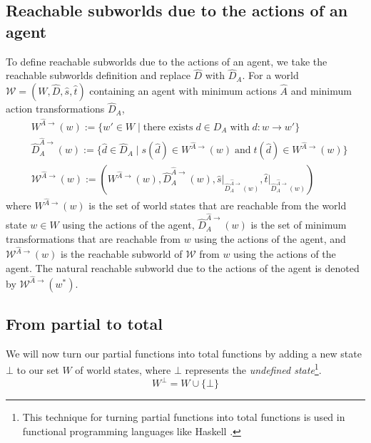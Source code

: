 \subsection{Reachable subworlds due to the actions of an agent}


To define reachable subworlds due to the actions of an agent, we take the reachable subworlds definition and replace $\hat{D}$ with $\hat{D}_{A}$.
For a world $\mathscr{W} = (W, \hat{D}, \hat{s}, \hat{t})$ containing an agent with minimum actions $\hat{A}$ and minimum action transformations $\hat{D}_{A}$,
\begin{align}
	 & W^{\hat{A}\to}(w) := \{ w' \in W \mid \text{there exists} \; d \in D_{A} \; \text{with} \; d: w \to w' \}                                                                 \\
	 & \hat{D}_{A}^{\hat{A}\to}(w) := \{ \hat{d} \in \hat{D}_{A} \mid s(\hat{d}) \in W^{\hat{A}\to}(w) \; \text{and} \; t(\hat{d}) \in W^{\hat{A}\to}(w) \}                      \\
	 & \mathscr{W}^{\hat{A}\to}(w) := (W^{\hat{A}\to}(w), \hat{D}_{A}^{\hat{A}\to}(w), \hat{s} \big|_{\hat{D}_{A}^{\hat{A}\to}(w)}, \hat{t} \big|_{\hat{D}_{A}^{\hat{A}\to}(w)})
\end{align}
where $W^{\hat{A}\to}(w)$ is the set of world states that are reachable from the world state $w \in W$ using the actions of the agent, $\hat{D}_{A}^{\hat{A}\to}(w)$ is the set of minimum transformations that are reachable from $w$ using the actions of the agent, and $\mathscr{W}^{\hat{A}\to}(w)$ is the reachable subworld of $\mathscr{W}$ from $w$ using the actions of the agent.
The natural reachable subworld due to the actions of the agent is denoted by $\mathscr{W}^{\hat{A}\to}(w^{*})$.


\subsection{From partial to total}

We will now turn our partial functions into total functions by adding a new state $\bot$ to our set $W$ of world states, where $\bot$ represents the \emph{undefined state}\footnote{
	This technique for turning partial functions into total functions is used in functional programming languages like Haskell .
}.
\begin{equation}
	W^{\bot} = W \cup \{ \bot \}
\end{equation}

